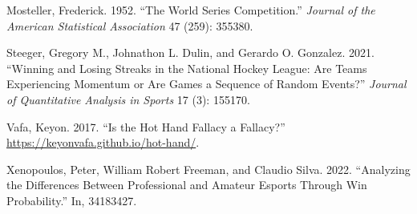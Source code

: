 \documentclass{article}
\newlength{\cslhangindent}
\newlength{\cslentryspacingunit} %
\newenvironment{CSLReferences}[2] %
 {%
  \setlength{\parindent}{0pt}
  \ifodd #1
  \let\oldpar\par
  \def\par{\hangindent=\cslhangindent\oldpar}
  \fi
  \setlength{\parskip}{#2\cslentryspacingunit}
 }%
 {}
\begin{document}
\begin{CSLReferences}{1}{0}
\leavevmode{}%
Mosteller, Frederick. 1952. {``The World Series Competition.''}
\emph{Journal of the American Statistical Association} 47 (259): 355380.

\leavevmode{}%
Steeger, Gregory M., Johnathon L. Dulin, and Gerardo O. Gonzalez. 2021.
{``Winning and Losing Streaks in the National Hockey League: Are Teams
Experiencing Momentum or Are Games a Sequence of Random Events?''}
\emph{Journal of Quantitative Analysis in Sports} 17 (3): 155170.

\leavevmode{}%
Vafa, Keyon. 2017. {``Is the Hot Hand Fallacy a Fallacy?''}
\url{https://keyonvafa.github.io/hot-hand/}.

\leavevmode{}%
Xenopoulos, Peter, William Robert Freeman, and Claudio Silva. 2022.
{``Analyzing the Differences Between Professional and Amateur Esports
Through Win Probability.''} In, 34183427.

\end{CSLReferences}



\end{document}
